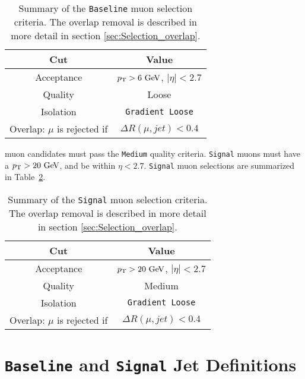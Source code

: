 \begin{table}[h!]
  \caption{Summary of the {\tt Baseline} muon selection criteria. The overlap removal is described in more detail in section \ref{sec:Selection_overlap}.} 
  \label{tb:muons:baseline}
    \begin{center}
    \begin{tabular}{c|c} \hline \hline
      Cut & Value \\ \hline \hline
      Acceptance & $\pT > 6\gev$, $|\eta| < 2.7$ \\ \hline
      Quality & Loose \\ \hline
      Isolation & {\tt Gradient Loose} \\ \hline
      Overlap: $\mu$ is rejected if &  $ \Delta R(\mu,jet) < 0.4 $ \\ \hline
      \hline
    \end{tabular}
  \end{center}
\end{table}%

 muon candidates must pass the {\tt Medium} quality criteria.  {\tt Signal} muons must have a $\pT > 20 \gev$, and be within $\eta < 2.7$.  {\tt Signal} muon selections are summarized in Table~\ref{tb:muons:signal}. \\  

\begin{table}[h!]
  \caption{Summary of the {\tt Signal} muon selection criteria.  The overlap removal is described in more detail in section \ref{sec:Selection_overlap}. }
  \label{tb:muons:signal}
  \begin{center}
    \begin{tabular}{c|c} \hline \hline
      Cut & Value \\ \hline \hline
      Acceptance & $\pT > 20\gev$, $|\eta| < 2.7$ \\ \hline
      Quality & Medium \\ \hline
      Isolation & {\tt Gradient Loose} \\ \hline
      Overlap: $\mu$ is rejected if &  $ \Delta R(\mu,jet) < 0.4 $ \\ \hline
      \hline
    \end{tabular}
  \end{center}
\end{table}%

\section{{\tt Baseline} and {\tt Signal} Jet Definitions}
